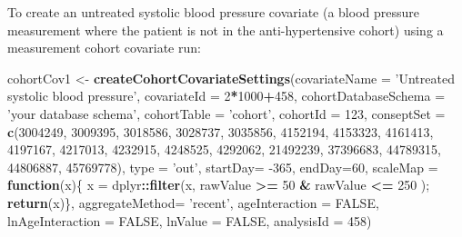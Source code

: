 \documentclass[
]{article}
\newenvironment{Shaded}{\begin{snugshade}}{\end{snugshade}}
\newcommand{\ControlFlowTok}[1]{\textcolor[rgb]{0.13,0.29,0.53}{\textbf{#1}}}
\newcommand{\DataTypeTok}[1]{\textcolor[rgb]{0.13,0.29,0.53}{#1}}
\newcommand{\DecValTok}[1]{\textcolor[rgb]{0.00,0.00,0.81}{#1}}
\newcommand{\KeywordTok}[1]{\textcolor[rgb]{0.13,0.29,0.53}{\textbf{#1}}}
\newcommand{\NormalTok}[1]{#1}
\newcommand{\OperatorTok}[1]{\textcolor[rgb]{0.81,0.36,0.00}{\textbf{#1}}}
\newcommand{\OtherTok}[1]{\textcolor[rgb]{0.56,0.35,0.01}{#1}}
\newcommand{\StringTok}[1]{\textcolor[rgb]{0.31,0.60,0.02}{#1}}
\begin{document}
To create an untreated systolic blood pressure covariate (a blood
pressure measurement where the patient is not in the anti-hypertensive
cohort) using a measurement cohort covariate run:

\begin{Shaded}
\begin{Highlighting}[]
\NormalTok{cohortCov1 <-}\StringTok{ }\KeywordTok{createCohortCovariateSettings}\NormalTok{(}\DataTypeTok{covariateName =} \StringTok{'Untreated systolic blood pressure'}\NormalTok{,}
                                            \DataTypeTok{covariateId =} \DecValTok{2}\OperatorTok{*}\DecValTok{1000}\OperatorTok{+}\DecValTok{458}\NormalTok{,}
                                            \DataTypeTok{cohortDatabaseSchema =} \StringTok{'your database schema'}\NormalTok{,}
                                            \DataTypeTok{cohortTable =} \StringTok{'cohort'}\NormalTok{,}
                                            \DataTypeTok{cohortId =} \DecValTok{123}\NormalTok{,}
                                            \DataTypeTok{conseptSet =} \KeywordTok{c}\NormalTok{(}\DecValTok{3004249}\NormalTok{, }\DecValTok{3009395}\NormalTok{, }\DecValTok{3018586}\NormalTok{, }\DecValTok{3028737}\NormalTok{, }\DecValTok{3035856}\NormalTok{, }\DecValTok{4152194}\NormalTok{, }\DecValTok{4153323}\NormalTok{, }\DecValTok{4161413}\NormalTok{, }\DecValTok{4197167}\NormalTok{, }\DecValTok{4217013}\NormalTok{, }\DecValTok{4232915}\NormalTok{, }\DecValTok{4248525}\NormalTok{, }\DecValTok{4292062}\NormalTok{, }\DecValTok{21492239}\NormalTok{, }\DecValTok{37396683}\NormalTok{, }\DecValTok{44789315}\NormalTok{, }\DecValTok{44806887}\NormalTok{, }\DecValTok{45769778}\NormalTok{),}
                                            \DataTypeTok{type =} \StringTok{'out'}\NormalTok{,}
                                            \DataTypeTok{startDay=} \DecValTok{-365}\NormalTok{, }
                                            \DataTypeTok{endDay=}\DecValTok{60}\NormalTok{,}
                                            \DataTypeTok{scaleMap =} \ControlFlowTok{function}\NormalTok{(x)\{ x =}\StringTok{ }\NormalTok{dplyr}\OperatorTok{::}\KeywordTok{filter}\NormalTok{(x, rawValue }\OperatorTok{>=}\StringTok{ }\DecValTok{50} \OperatorTok{&}\StringTok{ }\NormalTok{rawValue }\OperatorTok{<=}\StringTok{ }\DecValTok{250}\NormalTok{ ); }\KeywordTok{return}\NormalTok{(x)\},}
                                            \DataTypeTok{aggregateMethod=} \StringTok{'recent'}\NormalTok{, }
                                            \DataTypeTok{ageInteraction =} \OtherTok{FALSE}\NormalTok{,}
                                            \DataTypeTok{lnAgeInteraction =} \OtherTok{FALSE}\NormalTok{,}
                                            \DataTypeTok{lnValue =} \OtherTok{FALSE}\NormalTok{,}
                                            \DataTypeTok{analysisId =} \DecValTok{458}\NormalTok{)}
\end{Highlighting}
\end{Shaded}
\end{document}
